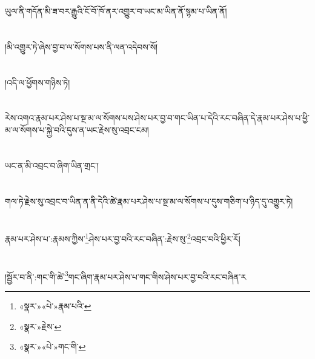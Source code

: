 ཡུལ་ནི་གདོན་མི་ཟ་བར་རྒྱུའི་ངོ་བོ་ཁོ་ནར་འགྱུར་བ་ཡང་མ་ཡིན་ནོ་སྙམ་པ་ཡིན་ནོ།\chapter{ }།མི་འགྱུར་ཏེ་ཞེས་བྱ་བ་ལ་སོགས་པས་ནི་ལན་འདེབས་སོ།\chapter{ }།འདི་ལ་ཕྱོགས་གཉིས་ཏེ།\chapter{ }རེས་འགའ་རྣམ་པར་ཤེས་པ་སྔ་མ་ལ་སོགས་པས་ཤེས་པར་བྱ་བ་གང་ཡིན་པ་དེའི་རང་བཞིན་དེ་རྣམ་པར་ཤེས་པ་ཕྱི་མ་ལ་སོགས་པ་སྐྱེ་བའི་དུས་ན་ཡང་རྗེས་སུ་འབྲང་ངམ།\chapter{ }ཡང་ན་མི་འབྲང་བ་ཞིག་ཡིན་གྲང་།\chapter{ }གལ་ཏེ་རྗེས་སུ་འབྲང་བ་ཡིན་ན་ནི་དེའི་ཚེ་རྣམ་པར་ཤེས་པ་སྔ་མ་ལ་སོགས་པ་དུས་གཅིག་པ་ཉིད་དུ་འགྱུར་ཏེ།\chapter{ }རྣམ་པར་ཤེས་པ་:རྣམས་ཀྱིས་\footnote{«སྣར་»«པེ་»རྣམ་པའི་}ཤེས་པར་བྱ་བའི་རང་བཞིན་:རྗེས་སུ་\footnote{«སྣར་»རྗེས་}འབྲང་བའི་ཕྱིར་རོ།\chapter{ }།སྦྱོར་བ་ནི་:གང་གི་ཚེ་\footnote{«སྣར་»«པེ་»གང་གི་}གང་ཞིག་རྣམ་པར་ཤེས་པ་གང་གིས་ཤེས་པར་བྱ་བའི་རང་བཞིན་ར